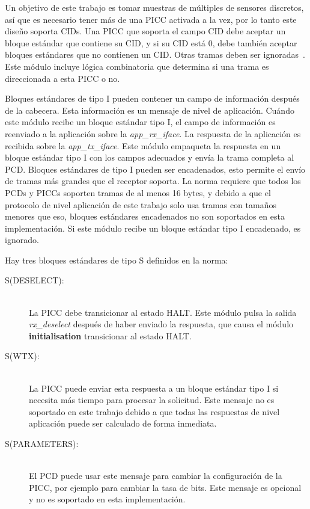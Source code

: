 \documentclass[a4paper, twoside, 11pt]{report}
\begin{document}
Un objetivo de este trabajo es tomar muestras de múltiples de sensores discretos, así que es necesario tener más de una PICC activada a la vez, por lo tanto este diseño soporta CIDs. Una PICC que soporta el campo CID debe aceptar un bloque estándar que contiene su CID, y si su CID está 0, debe también aceptar bloques estándares que no contienen un CID. Otras tramas deben ser ignoradas~\cite{iso14443-4}. Este módulo incluye lógica combinatoria que determina si una trama es direccionada a esta PICC o no.

Bloques estándares de tipo I pueden contener un campo de información después de la cabecera. Esta información es un mensaje de nivel de aplicación. Cuándo este módulo recibe un bloque estándar tipo I, el campo de información es reenviado a la aplicación sobre la \textit{app\_rx\_iface}. La respuesta de la aplicación es recibida sobre la \textit{app\_tx\_iface}. Este módulo empaqueta la respuesta en un bloque estándar tipo I con los campos adecuados y envía la trama completa al PCD. Bloques estándares de tipo I pueden ser encadenados, esto permite el envío de tramas más grandes que el receptor soporta. La norma requiere que todos los PCDs y PICCs soporten tramas de al menos 16 bytes, y debido a que el protocolo de nivel aplicación de este trabajo solo usa tramas con tamaños menores que eso, bloques estándares encadenados no son soportados en esta implementación. Si este módulo recibe un bloque estándar tipo I encadenado, es ignorado.

Hay tres bloques estándares de tipo S definidos en la norma:

\begin{description}
  \item[S(DESELECT):] \hfill \\ La PICC debe transicionar al estado HALT. Este módulo pulsa la salida \textit{rx\_deselect} después de haber enviado la respuesta, que causa el módulo \textbf{initialisation} transicionar al estado HALT.
  \item[S(WTX):] \hfill \\ La PICC puede enviar esta respuesta a un bloque estándar tipo I si necesita más tiempo para procesar la solicitud. Este mensaje no es soportado en este trabajo debido a que todas las respuestas de nivel aplicación puede ser calculado de forma inmediata.
  \item[S(PARAMETERS):] \hfill \\ El PCD puede usar este mensaje para cambiar la configuración de la PICC, por ejemplo para cambiar la tasa de bits. Este mensaje es opcional y no es soportado en esta implementación.
\end{description}
\end{document}
